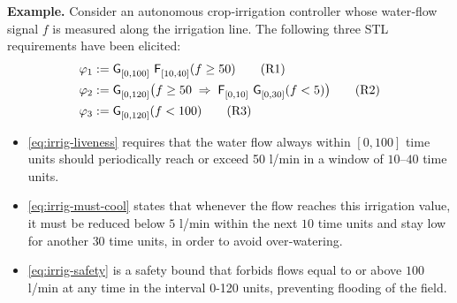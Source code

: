\documentclass{easychair}
\begin{document}


\noindent \textbf{Example.}
Consider an autonomous crop‑irrigation controller whose water‑flow signal $f$
is measured along the irrigation line.
The following three STL requirements have been elicited:
\begin{subequations}\label{eq:irrig-requirements}
\begin{align}
\varphi_1 &:= \mathop{\mathsf{\mathsf{G}}^{{}}_{[0,100]}}\,\mathop{\mathsf{\mathsf{F}}^{{}}_{[10,40]}} (f \ge 50) 
\tag{R1}\label{eq:irrig-liveness}\\
\varphi_2 &:= \mathop{\mathsf{\mathsf{G}}^{{}}_{[0,120]}}\bigl( f \ge 50 \;\Rightarrow\;
               \mathop{\mathsf{\mathsf{F}}^{{}}_{[0,10]}}\,\mathop{\mathsf{\mathsf{G}}^{{}}_{[0,30]}} (f < 5) \bigr)
\tag{R2}\label{eq:irrig-must-cool}\\
\varphi_3 &:= \mathop{\mathsf{\mathsf{G}}^{{}}_{[0,120]}} (f < 100) 
\tag{R3}\label{eq:irrig-safety}
\end{align}
\end{subequations}

\begin{itemize}[nosep]
  \item \eqref{eq:irrig-liveness} requires that
 the water flow always within $[0,100]$ time units
 should periodically reach or exceed 50 l/min in a window of $10$–$40$ time units.
  \item \eqref{eq:irrig-must-cool} states that whenever the flow reaches this irrigation value, it must be reduced below $5$ l/min within the next $10$ time units and stay low for another $30$ time units,
 in order to avoid over‑watering.
  \item \eqref{eq:irrig-safety}  is a safety bound that forbids flows equal to or above
        $100$ l/min at any time in the interval 0-120 units, preventing flooding of the field.
\end{itemize}
\end{document}
